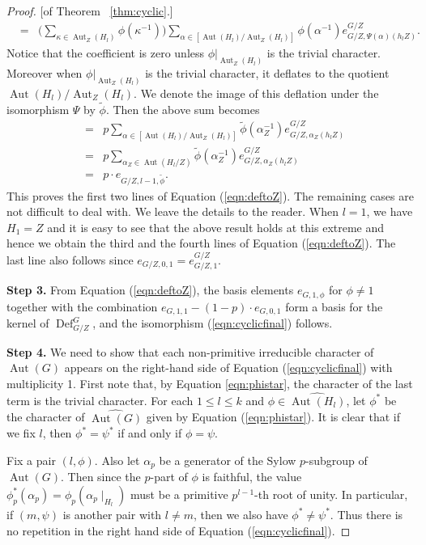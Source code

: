 \documentclass[10pt,a4paper]{amsart}
\newcommand{\Aut}{\operatorname{Aut}}
\newcommand{\defl}{\operatorname{Def}}
\begin{document}
\begin{proof}{[of Theorem ~\ref{thm:cyclic}.]}
\begin{eqnarray*}
&=& \Big(\sum_{\kappa\in\Aut_Z(H_l)}\phi(\kappa^{-1})\Big)\sum_{\alpha\in [\Aut(H_l)/\Aut_Z(H_l)]} \phi(\alpha^{-1}) e_{G/Z, \Psi(\alpha)(h_lZ)}^{G/Z}.
\end{eqnarray*}
Notice that the coefficient is zero unless $\phi|_{\Aut_Z(H_l)}$ is the trivial character. Moreover when $\phi|_{\Aut_Z(H_l)}$ is the trivial character, it deflates to the quotient $\Aut(H_l)/\Aut_Z(H_l)$. We denote the image of this deflation under the isomorphism $\Psi$ by $\tilde\phi$. Then the above sum becomes
\begin{eqnarray*}
&=& p\sum_{\alpha\in [\Aut(H_l)/\Aut_Z(H_l)]} \tilde\phi(\alpha^{-1}_Z) e_{G/Z, \alpha_Z(h_lZ)}^{G/Z}\\
&=& p\sum_{\alpha_Z\in \Aut(H_l/Z)} \tilde\phi(\alpha^{-1}_Z) e_{G/Z, \alpha_Z(h_lZ)}^{G/Z}\\
&=& p\cdot e_{G/Z, l-1, \tilde\phi}.
\end{eqnarray*}
This proves the first two lines of Equation (\ref{eqn:deftoZ}). The remaining cases are not difficult to deal with. We leave the details to the reader. When $l=1$, we have $H_1 = Z$ and it is easy to see that the above result holds at this extreme and hence we obtain the third and the fourth lines of Equation (\ref{eqn:deftoZ}). The last line also follows since $e_{G/Z, 0, 1} = e_{G/Z, 1}^{G/Z}$.

\smallskip
\noindent\textbf{Step 3.}
From Equation (\ref{eqn:deftoZ}), the basis elements $e_{G, 1, \phi}$ for $\phi\not=1$ together with the combination $e_{G, 1, 1} - (1-p)\cdot e_{G, 0, 1}$ form a basis for the kernel of $\defl^G_{G/Z}$, and the isomorphism (\ref{eqn:cyclicfinal}) follows.

\smallskip
\noindent\textbf{Step 4.}
We need to show that each non-primitive irreducible character of $\Aut(G)$ appears on the right-hand side of Equation (\ref{eqn:cyclicfinal}) with multiplicity 1. First note that, by Equation \ref{eqn:phistar}, the character of the last term is the trivial character. For each $1\le l\le k$ and $\phi\in\widehat{\Aut(H_l)}$, let $\phi^*$ be the character of $\widehat{\Aut(G)}$ given by Equation (\ref{eqn:phistar}). It is clear that if we fix $l$, then $\phi^* = \psi^*$ if and only if $\phi = \psi$.

Fix a pair $(l, \phi)$. Also let $\alpha_p$ be a generator of the Sylow $p$-subgroup of $\Aut(G)$. Then since the $p$-part of $\phi$ is faithful, the value $\phi^*_p(\alpha_p) = \phi_p(\alpha_p\mid_{H_l})$ must be a primitive $p^{l-1}$-th root of unity. In particular, if $(m, \psi)$ is another pair with $l\not= m$, then we also have $\phi^*\not=\psi^*$. Thus there is no repetition in the right hand side of Equation (\ref{eqn:cyclicfinal}).


\end{proof}
\end{document}
